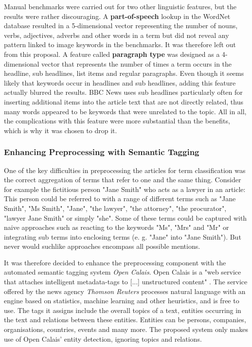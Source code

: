 \documentclass[11pt,a4paper,twoside]{article}
\begin{document}
Manual benchmarks were carried out for two other linguistic features, but the results were rather discouraging. A \textbf{part-of-speech} lookup in the WordNet database \cite{Fellbaum1998WordNet:Database} resulted in a 5-dimensional vector representing the number of nouns, verbs, adjectives, adverbs and other words in a term but did not reveal any pattern linked to image keywords in the benchmarks. It was therefore left out from this proposal. A feature called \textbf{paragraph type} was designed as a 4-dimensional vector that represents the number of times a term occurs in the headline, sub headlines, list items and regular paragraphs. Even though it seems likely that keywords occur in headlines and sub headlines, adding this feature actually blurred the results. BBC News uses sub headlines particularly often for inserting additional items into the article text that are not directly related, thus many words appeared to be keywords that were unrelated to the topic. All in all, the complications with this feature were more substantial than the benefits, which is why it was chosen to drop it.

\subsubsection{Enhancing Preprocessing with Semantic Tagging} \label{SystemPreprocessCalais}

One of the key difficulties in preprocessing the articles for term classification was the correct aggregation of terms that refer to one and the same thing. Consider for example the fictitious person "Jane Smith" who acts as a lawyer in an article: This person could be referred to with a range of different terms such as "Jane Smith", "Ms Smith", "Jane", "the lawyer", "the attorney", "the procurator", "lawyer Jane Smith" or simply "she". Some of these terms could be captured with naive approaches such as reacting to the keywords "Ms", "Mrs" and "Mr" or integrating sub terms into enclosing terms (e. g. "Jane" into "Jane Smith"). But never would suchlike approaches encompass all possible mentions.

It was therefore decided to enhance the preprocessing component with the automated semantic tagging system \emph{Open Calais}. Open Calais is a "web service that attaches intelligent metadata-tags to [...] unstructured content" \cite[p. 1]{ThomsonReuters2018ThomsonGuide}. The service offered by the news agency \emph{Thomson Reuters} processes natural language with an engine based on statistics, machine learning and other heuristics, and is free to use. The tags it assigns include the overall topics of a text, entities occurring in the text and relations between these entities. Entities can be persons, companies, organisations, countries, events and many more. The proposed system only makes use of Open Calais' entity detection, ignoring topics and relations.
\end{document}
